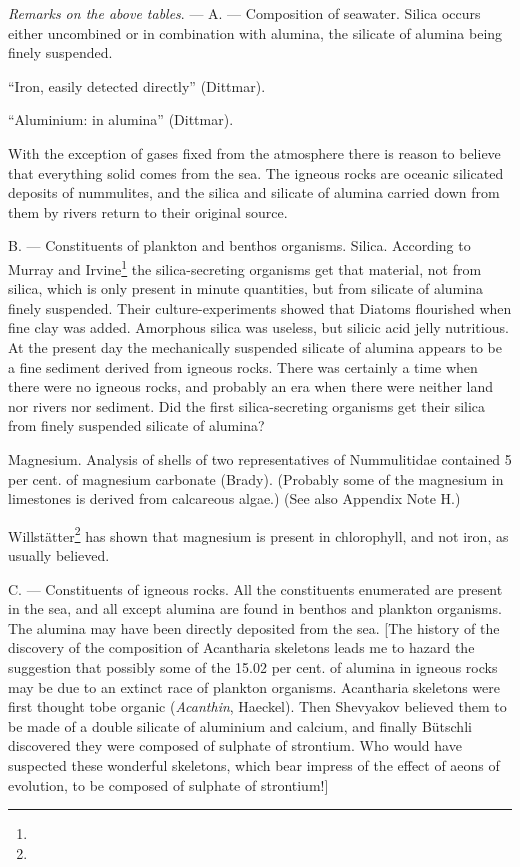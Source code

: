 \documentclass[a4paper, 12pt, oneside]{article}
\begin{document}
\emph{Remarks on the above tables}. --- A. --- Composition of seawater. Silica occurs either uncombined or in combination with alumina, the silicate of alumina being finely suspended.

``Iron, easily detected directly'' (Dittmar).

``Aluminium: in alumina'' (Dittmar).

With the exception of gases fixed from the atmosphere there is reason to believe that everything solid comes from the sea. The igneous rocks are oceanic silicated deposits of nummulites, and the silica and silicate of alumina carried down from them by rivers return to their original source.

B. --- Constituents of plankton and benthos organisms. Silica. According to Murray and Irvine\footnote{} the silica-secreting organisms get that material, not from silica, which is only present in minute quantities, but from silicate of alumina finely suspended. Their culture-experiments showed that Diatoms flourished when fine clay was added. Amorphous silica was useless, but silicic acid jelly nutritious. At the present day the mechanically suspended silicate of alumina appears to be a fine sediment derived from igneous rocks. There was certainly a time when there were no igneous rocks, and probably an era when there were neither land nor rivers nor sediment. Did the first silica-secreting organisms get their silica from finely suspended silicate of alumina?

Magnesium. Analysis of shells of two representatives of Nummulitidae contained 5 per cent. of magnesium carbonate (Brady). (Probably some of the magnesium in limestones is derived from calcareous algae.) (See also Appendix Note H.)

Willstätter\footnote{} has shown that magnesium is present in chlorophyll, and not iron, as usually believed.

C. --- Constituents of igneous rocks. All the constituents enumerated are present in the sea, and all except alumina are found in benthos and plankton organisms. The alumina may have been directly deposited from the sea. [The history of the discovery of the composition of Acantharia skeletons leads me to hazard the suggestion that possibly some of the 15.02 per cent. of alumina in igneous rocks may be due to an extinct race of plankton organisms. Acantharia skeletons were first thought tobe organic (\emph{Acanthin}, Haeckel). Then Shevyakov believed them to be made of a double silicate of aluminium and calcium, and finally Bütschli discovered they were composed of sulphate of strontium. Who would have suspected these wonderful skeletons, which bear impress of the effect of aeons of evolution, to be composed of sulphate of strontium!]
\end{document}
